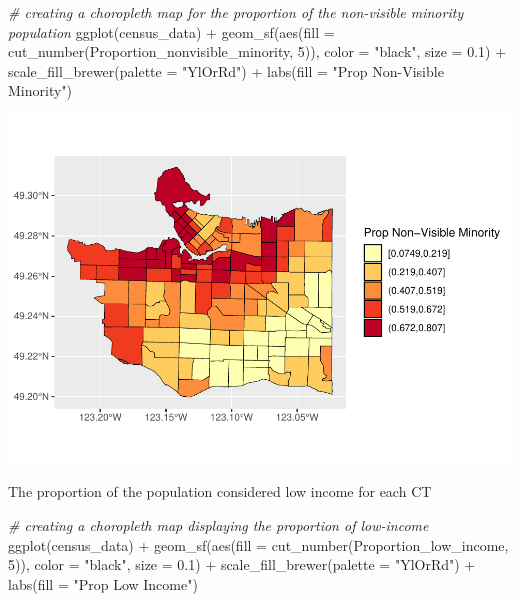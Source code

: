 \documentclass[
]{article}
\newenvironment{Shaded}{\begin{snugshade}}{\end{snugshade}}
\newcommand{\AttributeTok}[1]{\textcolor[rgb]{0.77,0.63,0.00}{#1}}
\newcommand{\CommentTok}[1]{\textcolor[rgb]{0.56,0.35,0.01}{\textit{#1}}}
\newcommand{\DecValTok}[1]{\textcolor[rgb]{0.00,0.00,0.81}{#1}}
\newcommand{\FloatTok}[1]{\textcolor[rgb]{0.00,0.00,0.81}{#1}}
\newcommand{\FunctionTok}[1]{\textcolor[rgb]{0.00,0.00,0.00}{#1}}
\newcommand{\NormalTok}[1]{#1}
\newcommand{\SpecialCharTok}[1]{\textcolor[rgb]{0.00,0.00,0.00}{#1}}
\newcommand{\StringTok}[1]{\textcolor[rgb]{0.31,0.60,0.02}{#1}}
\begin{document}
\begin{Shaded}
\begin{Highlighting}[]
\CommentTok{\# creating a choropleth map for the proportion of the non{-}visible minority population}
\FunctionTok{ggplot}\NormalTok{(census\_data) }\SpecialCharTok{+}
\FunctionTok{geom\_sf}\NormalTok{(}\FunctionTok{aes}\NormalTok{(}\AttributeTok{fill =} \FunctionTok{cut\_number}\NormalTok{(Proportion\_nonvisible\_minority, }\DecValTok{5}\NormalTok{)),}
        \AttributeTok{color =} \StringTok{"black"}\NormalTok{,}
        \AttributeTok{size =} \FloatTok{0.1}\NormalTok{) }\SpecialCharTok{+}
\FunctionTok{scale\_fill\_brewer}\NormalTok{(}\AttributeTok{palette =} \StringTok{"YlOrRd"}\NormalTok{) }\SpecialCharTok{+}
\FunctionTok{labs}\NormalTok{(}\AttributeTok{fill =} \StringTok{"Prop Non{-}Visible Minority"}\NormalTok{)}
\end{Highlighting}
\end{Shaded}

\includegraphics{4GA3Markdown_files/figure-latex/unnamed-chunk-25-1.pdf}

The proportion of the population considered low income for each CT

\begin{Shaded}
\begin{Highlighting}[]
\CommentTok{\# creating a choropleth map displaying the proportion of low{-}income }
\FunctionTok{ggplot}\NormalTok{(census\_data) }\SpecialCharTok{+}
\FunctionTok{geom\_sf}\NormalTok{(}\FunctionTok{aes}\NormalTok{(}\AttributeTok{fill =} \FunctionTok{cut\_number}\NormalTok{(Proportion\_low\_income, }\DecValTok{5}\NormalTok{)),}
        \AttributeTok{color =} \StringTok{"black"}\NormalTok{,}
        \AttributeTok{size =} \FloatTok{0.1}\NormalTok{) }\SpecialCharTok{+}
\FunctionTok{scale\_fill\_brewer}\NormalTok{(}\AttributeTok{palette =} \StringTok{"YlOrRd"}\NormalTok{) }\SpecialCharTok{+}
\FunctionTok{labs}\NormalTok{(}\AttributeTok{fill =} \StringTok{"Prop Low Income"}\NormalTok{)}
\end{Highlighting}
\end{Shaded}
\end{document}
